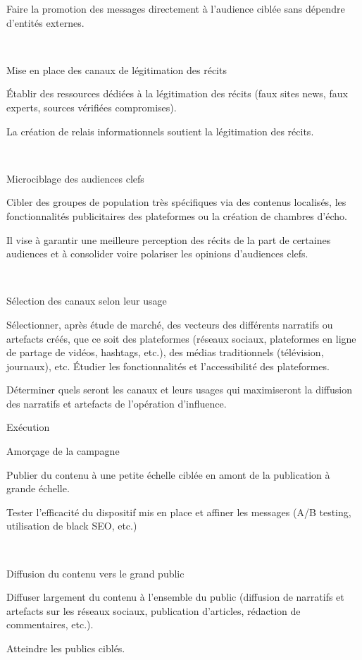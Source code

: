 Faire la promotion des messages directement à l’audience ciblée sans dépendre d’entités externes.

​
	

Mise en place des canaux de légitimation des récits
	

Établir des ressources dédiées à la légitimation des récits (faux sites news, faux experts, sources vérifiées compromises).
	

La création de relais informationnels soutient la légitimation des récits.

​
	

Microciblage des audiences clefs
	

Cibler des groupes de population très spécifiques via des contenus localisés, les fonctionnalités publicitaires des plateformes ou la création de chambres d’écho.
	

Il vise à garantir une meilleure perception des récits de la part de certaines audiences et à consolider voire polariser les opinions d’audiences clefs.

​
	

Sélection des canaux selon leur usage
	

Sélectionner, après étude de marché, des vecteurs des différents narratifs ou artefacts créés, que ce soit des plateformes (réseaux sociaux, plateformes en ligne de partage de vidéos, hashtags, etc.), des médias traditionnels (télévision, journaux), etc. Étudier les fonctionnalités et l’accessibilité des plateformes.
	

Déterminer quels seront les canaux et leurs usages qui maximiseront la diffusion des narratifs et artefacts de l’opération d’influence.

Exécution
	

Amorçage de la campagne
	

Publier du contenu à une petite échelle ciblée en amont de la publication à grande échelle.
	

Tester l’efficacité du dispositif mis en place et affiner les messages (A/B testing, utilisation de black SEO, etc.)

​
	

Diffusion du contenu vers le grand public
	

Diffuser largement du contenu à l’ensemble du public   (diffusion de narratifs et artefacts sur les réseaux sociaux, publication   d’articles, rédaction de commentaires, etc.).
	

Atteindre les publics ciblés.

​
	

